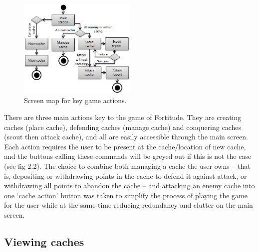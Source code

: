 \begin{figure}
	\vspace{-20pt}
	\begin{center}
	\includegraphics[width=0.5\textwidth]{images/key_actions}
	\caption{Screen map for key game actions.}
	\end{center}
	\vspace{-20pt}
\end{figure}

There are three main actions key to the game of Fortitude. They are creating caches (place cache), defending caches (manage cache) and conquering caches (scout then attack cache), and all are easily accessible through the main screen. Each action requires the user to be present at the cache/location of new cache, and the buttons calling these commands will be greyed out if this is not the case (see fig 2.2). The choice to combine both managing a cache the user owns – that is, depositing or withdrawing points in the cache to defend it against attack, or withdrawing all points to abandon the cache – and attacking an enemy cache into one ‘cache action’ button was taken to simplify the process of playing the game for the user while at the same time reducing redundancy and clutter on the main screen.

\subsection{Viewing caches}


